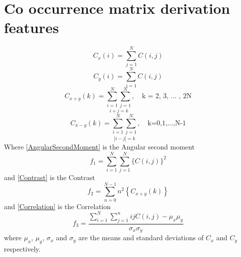 \chapter{Co occurrence matrix derivation features}
\label{derivationfeatures}
\begin{equation}\label{Cxi}
  C_x(i) = \sum_{j=1}^{N}C(i,j)
\end{equation}
\begin{equation}\label{Cyi}
  C_y(i) = \sum_{i=1}^{N}C(i,j)
\end{equation}
\begin{equation}\label{Cxplusy}
  C_{x+y}(k) = \underset{i+j=k}{\sum_{i=1}^{N}\sum_{j=1}^{N}}, \quad \text{k = 2, 3, ... , 2N}
\end{equation}
\begin{equation}\label{Cxminusy}
  C_{x-y}(k) = \underset{|i-j|=k}{\sum_{i=1}^{N}\sum_{j=1}^{N}}, \quad \text{k=0,1,...,N-1}
\end{equation}
Where \ref{AngularSecondMoment} is the Angular second moment
\begin{equation}\label{AngularSecondMoment}
  f_1 = \sum_{i=1}^{N}\sum_{j=1}^{N}\{C(i,j)\}^2
\end{equation}
and \ref{Contrast} is the Contrast
\begin{equation}\label{Contrast}
  f_2 = \sum_{n=0}^{N-1} n^2 \left\{C_{x+y}(k)\right\}
\end{equation}
and \ref{Correlation} is the Correlation
\begin{equation}\label{Correlation}
  f_3 = \frac{\sum_{i=1}^{N}\sum_{j=1}^{n} i j C(i,j) - \mu_x \mu_y}{\sigma_x\sigma_y}
\end{equation}
where $\mu_x$, $\mu_y$, $\sigma_x$ and $\sigma_y$ are the means and standard deviations of $C_x$ and $C_y$ respectively.

